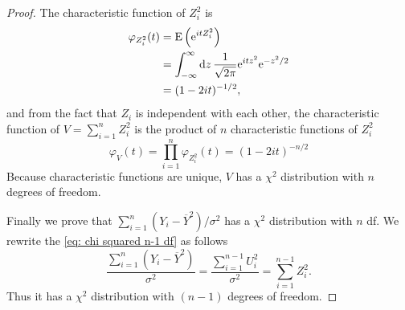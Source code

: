 \documentclass[10pt]{article}
\begin{document}
\begin{enumerate}
\begin{proof}
			The characteristic function of $Z_i^2$ is
			\begin{align*}
				\varphi_{Z_i^2}(t) &= \operatorname{E}\qty({\mathrm{e}}^{it Z_i^2}) \\
				&= \int_{-\infty}^{\infty} \dd{z} \frac{1}{\sqrt{2\pi}} {\mathrm{e}}^{it z^2} {\mathrm{e}}^{-z^2/2} \\
				&= (1 - 2it)^{-1/2},
			\end{align*}
			and from the fact that $Z_i$ is independent with each other, the characteristic function of $V = \sum_{i = 1}^n Z_i^2$ is the product of $n$ characteristic functions of $Z_i^2$
			\begin{equation}
				\varphi_{V}(t) = \prod_{i=1}^n \varphi_{Z_i^2}(t) = (1 - 2it)^{-n/2}
			\end{equation}
			Because characteristic functions are unique, $V$ has a $\chi^2$ distribution with $n$ degrees of freedom.

			Finally we prove that $\sum_{i=1}^n (Y_i - \overline{Y}^2)/\sigma^2$ has a $\chi^2$ distribution with $n$ df. We rewrite the \eqref{eq: chi squared n-1 df} as follows
			\begin{equation}
				\frac{\sum_{i=1}^n (Y_i - \overline{Y}^2)}{\sigma^2} = \frac{\sum_{i=1}^{n-1} U_i^2}{\sigma^2} = \sum_{i=1}^{n-1} Z_i^2.
			\end{equation}
			Thus it has a $\chi^2$ distribution with $(n-1)$ degrees of freedom.
		\end{proof}
	\end{enumerate}
\end{document}
